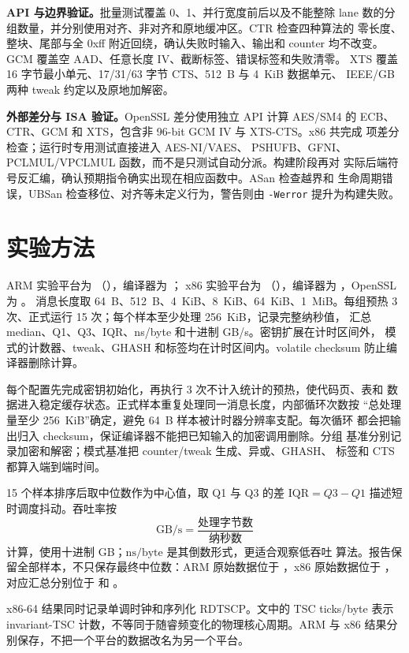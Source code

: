 \documentclass[11pt,a4paper,UTF8,fontset=none]{ctexart}
\begin{document}
\textbf{API 与边界验证。}批量测试覆盖 0、1、并行宽度前后以及不能整除 lane
数的分组数量，并分别使用对齐、非对齐和原地缓冲区。CTR 检查四种算法的
零长度、整块、尾部与全 0xff 附近回绕，确认失败时输入、输出和 counter
均不改变。GCM 覆盖空 AAD、任意长度 IV、截断标签、错误标签和失败清零。
XTS 覆盖 16 字节最小单元、17/31/63 字节 CTS、512~B 与 4~KiB 数据单元、
IEEE/GB 两种 tweak 约定以及原地加解密。

\textbf{外部差分与 ISA 验证。}OpenSSL 差分使用独立 API 计算 AES/SM4 的
ECB、CTR、GCM 和 XTS，包含非 96-bit GCM IV 与 XTS-CTS。x86 共完成
\XOpenSSLChecks 项差分检查；运行时专用测试直接进入 AES-NI/VAES、
PSHUFB、GFNI、PCLMUL/VPCLMUL 函数，而不是只测试自动分派。构建阶段再对
实际后端符号反汇编，确认预期指令确实出现在相应函数中。ASan 检查越界和
生命周期错误，UBSan 检查移位、对齐等未定义行为，警告则由
\texttt{-Werror} 提升为构建失败。

\section{实验方法}

ARM 实验平台为 \BenchCPU（\BenchPlatform），编译器为 \BenchCompiler；
x86 实验平台为 \XBenchCPU（\XBenchPlatform），编译器为
\XBenchCompiler，OpenSSL 为 \XOpenSSLVersion。
消息长度取 64~B、512~B、4~KiB、8~KiB、64~KiB、1~MiB。每组预热
3 次、正式运行 15 次；每个样本至少处理 256~KiB，记录完整纳秒值，
汇总 median、Q1、Q3、IQR、ns/byte 和十进制 GB/s。密钥扩展在计时区间外，
模式的计数器、tweak、GHASH 和标签均在计时区间内。volatile checksum
防止编译器删除计算。

每个配置先完成密钥初始化，再执行 3 次不计入统计的预热，使代码页、表和
数据进入稳定缓存状态。正式样本重复处理同一消息长度，内部循环次数按
“总处理量至少 256~KiB”确定，避免 64~B 样本被计时器分辨率支配。每次循环
都会把输出归入 checksum，保证编译器不能把已知输入的加密调用删除。分组
基准分别记录加密和解密；模式基准把 counter/tweak 生成、异或、GHASH、
标签和 CTS 都算入端到端时间。

15 个样本排序后取中位数作为中心值，取 Q1 与 Q3 的差
\(\mathrm{IQR}=Q3-Q1\) 描述短时调度抖动。吞吐率按
\[
  \mathrm{GB/s}=\frac{\text{处理字节数}}{\text{纳秒数}}
\]
计算，使用十进制 GB；\(\mathrm{ns/byte}\) 是其倒数形式，更适合观察低吞吐
算法。报告保留全部样本，不只保存最终中位数：ARM 原始数据位于
，x86 原始数据位于
，对应汇总分别位于
 和
。

x86-64 结果同时记录单调时钟和序列化 RDTSCP。文中的 TSC ticks/byte
表示 invariant-TSC 计数，不等同于随睿频变化的物理核心周期。ARM 与 x86
结果分别保存，不把一个平台的数据改名为另一个平台。
\end{document}
